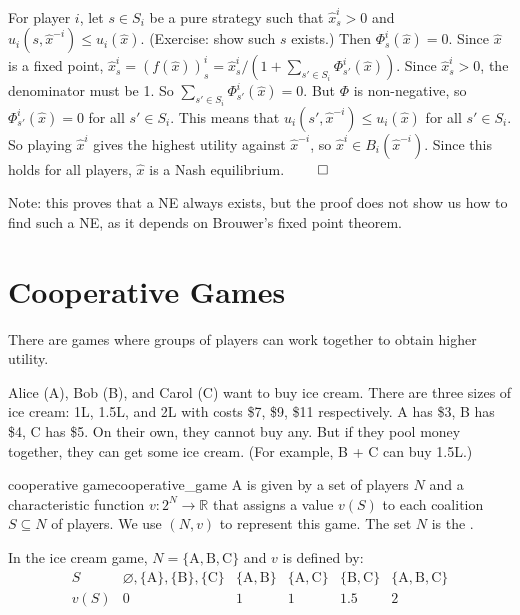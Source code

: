 \documentclass[12pt,letterpaper]{report}
\begin{document}
For player $i$, let $s \in S_i$ be a pure strategy such that $\hat{x}_s^i > 0$ and
$u_i(s, \hat{x}^{-i}) \leq u_i(\hat{x})$.
(Exercise: show such $s$ exists.)
Then $\Phi_s^i(\hat{x}) = 0$.
Since $\hat{x}$ is a fixed point, $\hat{x}_s^i = (f(\hat{x}))_s^i =
  \hat{x}_s^i / (1 + \sum\limits_{s' \in S_i} \Phi_{s'}^i (\hat{x}))$.
Since $\hat{x}_s^i > 0$, the denominator must be 1.
So $\sum\limits_{s' \in S_i} \Phi_{s'}^i(\hat{x}) = 0$.
But $\Phi$ is non-negative, so $\Phi_{s'}^i(\hat{x}) = 0$ for all $s' \in S_i$.
This means that $u_i(s', \hat{x}^{-i}) \leq u_i(\hat{x})$ for all $s' \in S_i$.
So playing $\hat{x}^i$ gives the highest utility against $\hat{x}^{-i}$, so
$\hat{x}^i \in B_i(\hat{x}^{-i})$.
Since this holds for all players, $\hat{x}$ is a Nash equilibrium.
\hfill $\qed$

Note: this proves that a NE always exists, but the proof does not show us how to find such a NE, as
it depends on Brouwer's fixed point theorem.


\section{Cooperative Games}

There are games where groups of players can work together to obtain higher utility.

\begin{ex}
  Alice (A), Bob (B), and Carol (C) want to buy ice cream.
  There are three sizes of ice cream: 1L, 1.5L, and 2L with costs \$7, \$9, \$11 respectively.
  A has \$3, B has \$4, C has \$5.
  On their own, they cannot buy any.
  But if they pool money together, they can get some ice cream.
  (For example, B + C can buy 1.5L.)
\end{ex}

\begin{defn}{cooperative game}{cooperative_game}
  A  is given by a set of players $N$ and a characteristic function
  $v \colon 2^N \to \mathbb{R}$ that assigns a value $v(S)$ to each coalition $S \subseteq N$ of
  players.
  We use $(N, v)$ to represent this game.
  The set $N$ is the .
\end{defn}

\begin{ex}
  In the ice cream game, $N = \{ \text{A}, \text{B}, \text{C} \}$ and $v$ is defined by:
  \[
    \begin{array}{c|c|c|c|c|c}
      S & \varnothing, \{\text{A}\}, \{\text{B}\}, \{\text{C}\} & \{\text{A}, \text{B}\}
        & \{\text{A}, \text{C}\} & \{\text{B}, \text{C}\} & \{\text{A}, \text{B}, \text{C}\} \\
      \hline
      v(S) & 0 & 1 & 1 & 1.5 & 2 \\
    \end{array}
  \]
\end{ex}
\end{document}
